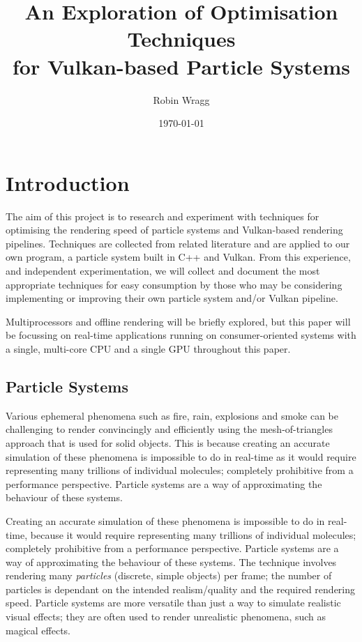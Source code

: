\documentclass[11pt, a4paper, twocolumn]{article}
\title{\sffamily\bfseries An Exploration of Optimisation Techniques\\for Vulkan-based Particle Systems}
\author{Robin Wragg}
\date{\today}
\begin{document}
\maketitle

\section{Introduction}

The aim of this project is to research and experiment with techniques for optimising the rendering speed of particle systems and Vulkan-based rendering pipelines. Techniques are collected from related literature and are applied to our own program, a particle system built in C++ and Vulkan. From this experience, and independent experimentation, we will collect and document the most appropriate techniques for easy consumption by those who may be considering implementing or improving their own particle system and/or Vulkan pipeline.

Multiprocessors and offline rendering will be briefly explored, but this paper will be focussing on real-time applications running on consumer-oriented systems with a single, multi-core CPU and a single GPU throughout this paper.

\subsection{Particle Systems}

Various ephemeral phenomena such as fire, rain, explosions and smoke can be challenging to render convincingly and efficiently using the mesh-of-triangles approach that is used for solid objects. This is because creating an accurate simulation of these phenomena is impossible to do in real-time as it would require representing many trillions of individual molecules; completely prohibitive from a performance perspective. Particle systems are a way of approximating the behaviour of these systems.

Creating an accurate simulation of these phenomena is impossible to do in real-time, because it would require representing many trillions of individual molecules; completely prohibitive from a performance perspective. Particle systems are a way of approximating the behaviour of these systems. The technique involves rendering many \emph{particles} (discrete, simple objects) per frame; the number of particles is dependant on the intended realism/quality and the required rendering speed. Particle systems are more versatile than just a way to simulate realistic visual effects; they are often used to render unrealistic phenomena, such as magical effects.
\end{document}
